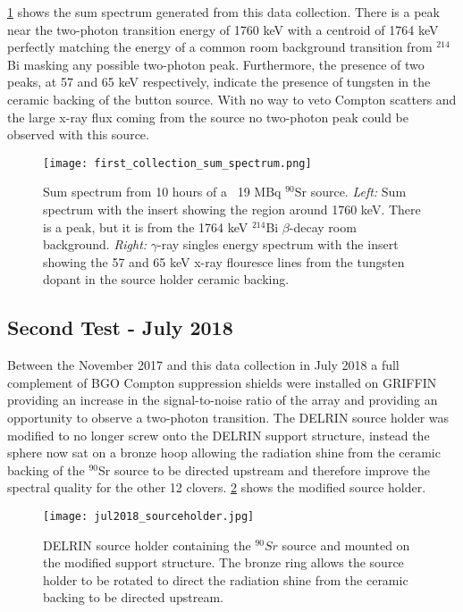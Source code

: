 \documentclass[cnatzke_thesis_proposal.tex]{subfiles}
\begin{document}
\ref{fig:sum_spectrum_jul2017} shows the sum spectrum generated from this data collection.
There is a peak near the two-photon transition energy of 1760 keV with a centroid of 1764 keV perfectly matching the energy of a common room background transition from $^{214}$Bi masking any possible two-photon peak.
Furthermore, the presence of two peaks, at 57 and 65 keV respectively, indicate the presence of tungsten in the ceramic backing of the button source.
With no way to veto Compton scatters and the large x-ray flux coming from the source no two-photon peak could be observed with this source.

\begin{figure}[htbp]
  \centering
  \texttt{[image: first\_collection\_sum\_spectrum.png]}
  \caption{Sum spectrum from 10 hours of a ~19 MBq $^{90}$Sr source.
    \textit{Left:} Sum spectrum with the insert showing the region around 1760 keV. There is a peak, but it is from the 1764 keV $^{214}$Bi $\beta$-decay room background.
    \textit{Right:} $\gamma$-ray singles energy spectrum with the insert showing the 57 and 65 keV x-ray flouresce lines from the tungsten dopant in the source holder ceramic backing.
  }
  \label{fig:sum_spectrum_jul2017}
\end{figure}

\subsection{Second Test - July 2018}
Between the November 2017 and this data collection in July 2018 a full complement of BGO Compton suppression shields were installed on GRIFFIN providing an increase in the signal-to-noise ratio of the array and providing an opportunity to observe a two-photon transition.
The DELRIN source holder was modified to no longer screw onto the DELRIN support structure, instead the sphere now sat on a bronze hoop allowing the radiation shine from the ceramic backing of the $^{90}$Sr source to be directed upstream and therefore improve the spectral quality for the other 12 clovers.
\ref{fig:source_holder_jul2018} shows the modified source holder.

\begin{figure}[htbp]
  \centering
  \texttt{[image: jul2018\_sourceholder.jpg]}
  \caption{DELRIN source holder containing the $^{90}Sr$ source and mounted on the modified support structure. The bronze ring allows the source holder to be rotated to direct the radiation shine from the ceramic backing to be directed upstream.}
  \label{fig:source_holder_jul2018}
\end{figure}
\end{document}
